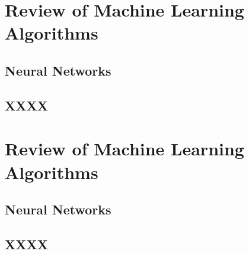 
\chapter{\label{app:1}Review of Machine Learning Algorithms}



\section{Neural Networks}
\label{sec:NN}


\section{XXXX}
\label{sec:xxxxx}


\chapter{\label{app:2}Review of Machine Learning Algorithms}



\section{Neural Networks}
\label{sec:NN}


\section{XXXX}
\label{sec:xxxxx}
